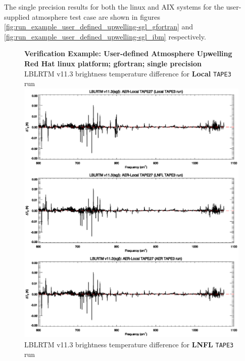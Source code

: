 The single precision results for both the linux and AIX systems for the user-supplied atmosphere test case are shown in figures \ref{fig:run_example_user_defined_upwelling-sgl_gfortran} and \ref{fig:run_example_user_defined_upwelling-sgl_ibm} respectively.

\begin{figure}[htp]
  \centering
  \qquad\sffamily\textbf{Verification Example: User-defined Atmosphere Upwelling}\\
  \qquad\sffamily\textbf{Red Hat linux platform; gfortran; single precision}\\
  \qquad\textsf{LBLRTM v11.3 brightness temperature difference for \textbf{Local} \texttt{TAPE3} run}\\
  \includegraphics[bb=82 490 534 648,clip,scale=1.0]{graphics/run_example_user_defined_upwelling/gfortran/sgl.eps}
  \qquad\textsf{LBLRTM v11.3 brightness temperature difference for \textbf{LNFL} \texttt{TAPE3} run}\\

\end{figure}
